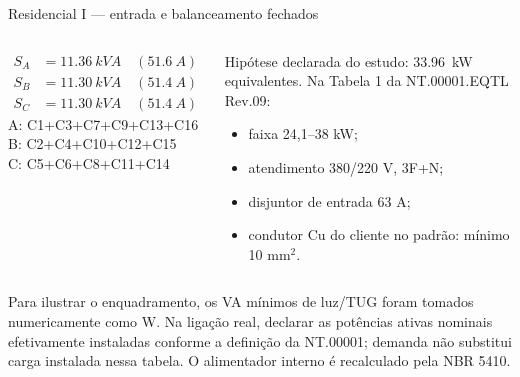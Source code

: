 \begin{frame}[shrink=4]{Residencial I — entrada e balanceamento fechados}
\small
\begin{columns}[T,onlytextwidth]
\begin{caixaProjeto}[title=Balanceamento por valores instalados]
\begin{align*}
S_A&=\SI{11.36}{kVA}\quad (\SI{51.6}{A})\\
S_B&=\SI{11.30}{kVA}\quad (\SI{51.4}{A})\\
S_C&=\SI{11.30}{kVA}\quad (\SI{51.4}{A})
\end{align*}
\scriptsize A: C1+C3+C7+C9+C13+C16\\
B: C2+C4+C10+C12+C15\\
C: C5+C6+C8+C11+C14
\end{caixaProjeto}
\begin{caixaNorma}[title=Equatorial Maranhão]
Hipótese declarada do estudo: \SI{33.96}{kW} equivalentes. Na Tabela 1 da NT.00001.EQTL Rev.09:
\begin{itemize}
\item faixa 24,1--38 kW;
\item atendimento 380/220 V, 3F+N;
\item disjuntor de entrada 63 A;
\item condutor Cu do cliente no padrão: mínimo 10 mm$^2$.
\end{itemize}
\end{caixaNorma}
\end{columns}
\begin{caixaAt}
Para ilustrar o enquadramento, os VA mínimos de luz/TUG foram tomados numericamente como W. Na ligação real, declarar as potências ativas nominais efetivamente instaladas conforme a definição da NT.00001; demanda não substitui carga instalada nessa tabela. O alimentador interno é recalculado pela NBR 5410.
\end{caixaAt}
\end{frame}

